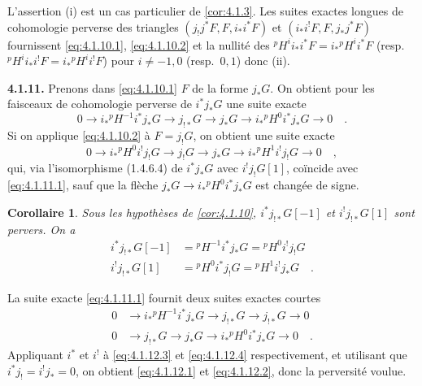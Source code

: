 \documentclass[12pt,a4paper]{article}
\theoremstyle{plain}
\newtheorem{corollary}[theorem]{Corollaire}
\theoremstyle{definition}
\begin{document}
L'assertion (i) est un cas particulier de \ref{cor:4.1.3}. Les suites exactes longues de cohomologie perverse des triangles $(j_{!}j^{*}F, F, i_{*}i^{*}F)$ et $(i_{*}i^{!}F, F, j_{*}j^{*}F)$ fournissent \eqref{eq:4.1.10.1}, \eqref{eq:4.1.10.2} et la nullit\'{e} des ${}^{p}H^{i}i_{*}i^{*}F = i_{*}{}^{p}H^{i}i^{*}F$ (resp.\ ${}^{p}H^{i}i_{*}i^{!}F = i_{*}{}^{p}H^{i}i^{!}F$) pour $i \neq -1,0$ (resp.\ $0,1$) donc (ii).

\noindent\textbf{4.1.11.} Prenons dans \eqref{eq:4.1.10.1} $F$ de la forme $j_{*}G$. On obtient pour les faisceaux de cohomologie perverse de $i^{*}j_{*}G$ une suite exacte
\begin{equation}\label{eq:4.1.11.1}
0 \to i_{*}{}^{p}H^{-1}i^{*}j_{*}G \to j_{!*}G \to j_{*}G \longrightarrow i_{*}{}^{p}H^{0}i^{*}j_{*}G \to 0\quad.
\end{equation}
Si on applique \eqref{eq:4.1.10.2} \`{a} $F = j_{!}G$, on obtient une suite exacte
\[
0 \to i_{*}{}^{p}H^{0}i^{!}j_{!}G \to j_{!}G \longrightarrow j_{*}G \longrightarrow i_{*}{}^{p}H^{1}i^{!}j_{!}G \to 0\quad,
\]
qui, via l'isomorphisme (1.4.6.4) de $i^{*}j_{*}G$ avec $i^{!}j_{!}G[1]$, co\"{i}ncide avec \eqref{eq:4.1.11.1}, sauf que la fl\`{e}che $j_{*}G \to i_{*}{}^{p}H^{0}i^{*}j_{*}G$ est chang\'{e}e de signe.

\begin{corollary}\label{cor:4.1.12}
Sous les hypoth\`{e}ses de \ref{cor:4.1.10}, $i^{*}j_{!*}G[-1]$ et $i^{!}j_{!*}G[1]$ sont pervers. On a
\begin{align}
i^{*}j_{!*}G[-1] &= {}^{p}H^{-1}i^{*}j_{*}G = {}^{p}H^{0}i^{!}j_{!}G \label{eq:4.1.12.1}\\
i^{!}j_{!*}G[1] &= {}^{p}H^{0}i^{*}j_{!}G = {}^{p}H^{1}i^{!}j_{*}G\quad. \label{eq:4.1.12.2}
\end{align}
\end{corollary}

La suite exacte \eqref{eq:4.1.11.1} fournit deux suites exactes courtes
\begin{align}
0 &\longrightarrow i_{*}{}^{p}H^{-1}i^{*}j_{*}G \to j_{!*}G \to j_{!*}G \longrightarrow 0 \label{eq:4.1.12.3}\\
0 &\longrightarrow j_{!*}G \longrightarrow j_{*}G \to i_{*}{}^{p}H^{0}i^{*}j_{*}G \to 0\quad. \label{eq:4.1.12.4}
\end{align}
Appliquant $i^{*}$ et $i^{!}$ \`{a} \eqref{eq:4.1.12.3} et \eqref{eq:4.1.12.4} respectivement, et utilisant que $i^{*}j_{!} = i^{!}j_{*} = 0$, on obtient \eqref{eq:4.1.12.1} et \eqref{eq:4.1.12.2}, donc la perversit\'{e} voulue.
\end{document}
